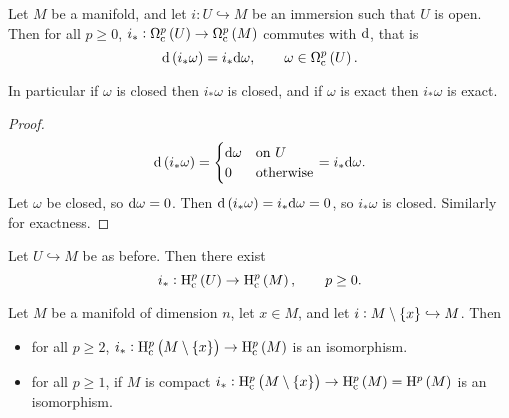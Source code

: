 \pagebreak

\begin{lemma}
Let $ M $ be a manifold, and let $ i : U \hookrightarrow M $ be an immersion such that $ U $ is open. Then for all $ p \ge 0 $, $ i_* : \Omega_\c^p\br{U} \to \Omega_\c^p\br{M} $ commutes with $ \mathrm{d} $, that is
$$ \d\br{i_*\omega} = i_*\d\omega, \qquad \omega \in \Omega_\c^p\br{U}. $$
\end{lemma}

In particular if $ \omega $ is closed then $ i_*\omega $ is closed, and if $ \omega $ is exact then $ i_*\omega $ is exact.

\begin{proof}
$$ \d\br{i_*\omega} =
\begin{cases}
\d\omega & \text{on} \ U \\
0 & \text{otherwise}
\end{cases}
= i_*\d\omega. $$
Let $ \omega $ be closed, so $ \mathrm{d}\omega = 0 $. Then $ \d\br{i_*\omega} = i_*\d\omega = 0 $, so $ i_*\omega $ is closed. Similarly for exactness.
\end{proof}

Let $ U \hookrightarrow M $ be as before. Then there exist
$$ i_* : \H_\c^p\br{U} \to \H_\c^p\br{M}, \qquad p \ge 0. $$

\begin{theorem}
\label{thm:2.43}
Let $ M $ be a manifold of dimension $ n $, let $ x \in M $, and let $ i : M \setminus \cbr{x} \hookrightarrow M $. Then
\begin{itemize}
\item for all $ p \ge 2 $, $ i_* : \H_\c^p\br{M \setminus \cbr{x}} \to \H_\c^p\br{M} $ is an isomorphism.
\item for all $ p \ge 1 $, if $ M $ is compact $ i_* : \H_\c^p\br{M \setminus \cbr{x}} \to \H_\c^p\br{M} = \H^p\br{M} $ is an isomorphism.
\end{itemize}
\end{theorem}

